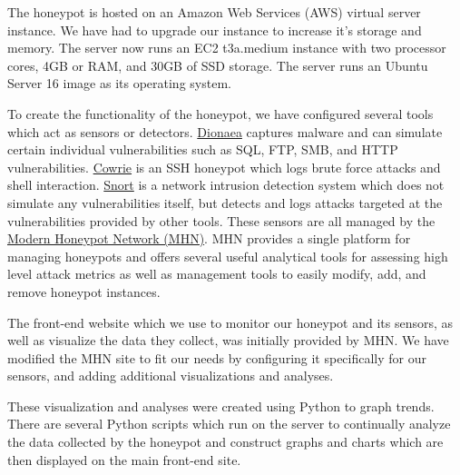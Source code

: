 The honeypot is hosted on an Amazon Web Services (AWS) virtual server instance. We have had to upgrade our instance to increase it's storage and memory. The server now runs an EC2 t3a.medium instance with two processor cores, 4GB or RAM, and 30GB of SSD storage. The server runs an Ubuntu Server 16 image as its operating system. 

To create the functionality of the honeypot, we have configured several tools which act as sensors or detectors. \href{https://github.com/DinoTools/dionaea}{Dionaea} captures malware and can simulate certain individual vulnerabilities such as SQL, FTP, SMB, and HTTP vulnerabilities. \href{https://github.com/cowrie/cowrie}{Cowrie} is an SSH honeypot which logs brute force attacks and shell interaction. \href{https://www.snort.org/}{Snort} is a network intrusion detection system which does not simulate any vulnerabilities itself, but detects and logs attacks targeted at the vulnerabilities provided by other tools. These sensors are all managed by the \href{https://github.com/pwnlandia/mhn}{Modern Honeypot Network (MHN)}. MHN provides a single platform for managing honeypots and offers several useful analytical tools for assessing high level attack metrics as well as management tools to easily modify, add, and remove honeypot instances. 

The front-end website which we use to monitor our honeypot and its sensors, as well as visualize the data they collect, was initially provided by MHN. We have modified the MHN site to fit our needs by configuring it specifically for our sensors, and adding additional visualizations and analyses. 

These visualization and analyses were created using Python to graph trends. There are several Python scripts which run on the server to continually analyze the data collected by the honeypot and construct graphs and charts which are then displayed on the main front-end site. 